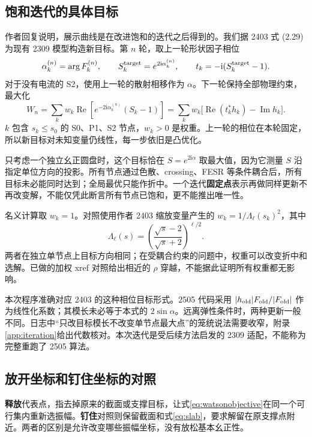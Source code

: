 \documentclass[UTF8,a4paper,11pt,fontset=fandol]{ctexart}
\numberwithin{equation}{section}
\newcommand{\ii}{\mathrm i}
\newcommand{\Ree}{\operatorname{Re}}
\newcommand{\Imm}{\operatorname{Im}}
\begin{document}
\subsection{饱和迭代的具体目标}
作者回复说明，展示曲线是在改进饱和的迭代之后得到的。我们据 2403 式 (2.29) 为现有 2309 模型构造新目标。第 \(n\) 轮，取上一轮形状因子相位
\begin{equation}
\alpha_k^{(n)}=\arg F_k^{(n)},\qquad
S_k^{\rm target}=e^{2\ii\alpha_k^{(n)}},\qquad
t_k=-\ii(S_k^{\rm target}-1).
\end{equation}
对于没有电流的 S2，使用上一轮的散射相移作为 \(\alpha\)。下一轮保持全部物理约束，最大化
\begin{equation}\label{eq:watsonobjective}
W_n=\sum_{k}w_k\Ree\!\left[e^{-2\ii\alpha_k^{(n)}}(S_k-1)\right]
=\sum_k w_k\big[\Ree(t_k^*h_k)-\Imm h_k\big].
\end{equation}
\(k\) 包含 \(s_k\le s_0\) 的 S0、P1、S2 节点，\(w_k>0\) 是权重。上一轮的相位在本轮固定，所以新目标对未知变量仍线性，每一步依旧是凸优化。

只考虑一个独立幺正圆盘时，这个目标恰在 \(S=e^{2\ii\alpha}\) 取最大值，因为它测量 \(S\) 沿指定单位方向的投影。所有节点通过色散、crossing、FESR 等条件耦合后，所有目标未必能同时达到；全局最优只能作折中。一个迭代\textbf{固定点}表示再做同样更新不再改变解，不能仅凭此断言所有节点已饱和，更不能推出唯一性。

名义计算取 \(w_k=1\)。对照使用作者 2403 缩放变量产生的 \(w_k=1/\Lambda_\ell(s_k)^2\)，其中
\begin{equation}
\Lambda_\ell(s)=\left(\frac{\sqrt s-2}{\sqrt s+2}\right)^{\ell/2}.
\end{equation}
两者在独立单节点上目标方向相同；在受耦合约束的问题中，权重可以改变折中和选解。已做的加权 xref 对照给出相近的 \(\rho\) 穿越，不能据此证明所有权重都无影响。

本次程序准确对应 2403 的这种相位目标形式。2505 代码采用 \(|h_{\rm old}|F_{\rm old}/|F_{\rm old}|\) 作为线性化系数；其模长未必等于本式的 \(2\sin\alpha\)。远离弹性条件时，两种更新一般不同。日志中“只改目标模长不改变单节点最大点”的笼统说法需要收窄，附录\ref{app:iteration}给出代数核对。本次迭代是受后续方法启发的 2309 适配，不能称为完整重跑了 2505 算法。

\subsection{放开坐标和钉住坐标的对照}
\textbf{释放}代表点，指去掉原来的截面或支撑目标，让式\eqref{eq:watsonobjective}在同一个可行集内重新选振幅。\textbf{钉住}对照则保留截面和式\eqref{eq:slab}，要求解留在原支撑点附近。两者的区别是允许改变哪些振幅坐标，没有放松基本幺正性。
\end{document}
